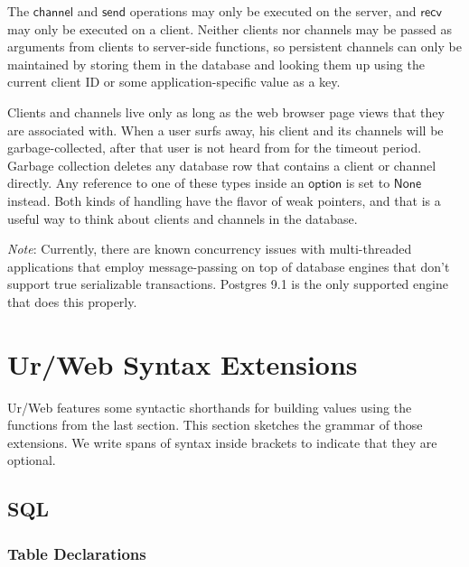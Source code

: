 \documentclass{article}
\newcommand{\mt}[1]{\mathsf{#1}}
\begin{document}
The $\mt{channel}$ and $\mt{send}$ operations may only be executed on the server, and $\mt{recv}$ may only be executed on a client.  Neither clients nor channels may be passed as arguments from clients to server-side functions, so persistent channels can only be maintained by storing them in the database and looking them up using the current client ID or some application-specific value as a key.

Clients and channels live only as long as the web browser page views that they are associated with.  When a user surfs away, his client and its channels will be garbage-collected, after that user is not heard from for the timeout period.  Garbage collection deletes any database row that contains a client or channel directly.  Any reference to one of these types inside an $\mt{option}$ is set to $\mt{None}$ instead.  Both kinds of handling have the flavor of weak pointers, and that is a useful way to think about clients and channels in the database.

\emph{Note}: Currently, there are known concurrency issues with multi-threaded applications that employ message-passing on top of database engines that don't support true serializable transactions.  Postgres 9.1 is the only supported engine that does this properly.


\section{Ur/Web Syntax Extensions}

Ur/Web features some syntactic shorthands for building values using the functions from the last section.  This section sketches the grammar of those extensions.  We write spans of syntax inside brackets to indicate that they are optional.

\subsection{SQL}

\subsubsection{\label{tables}Table Declarations}
\end{document}
